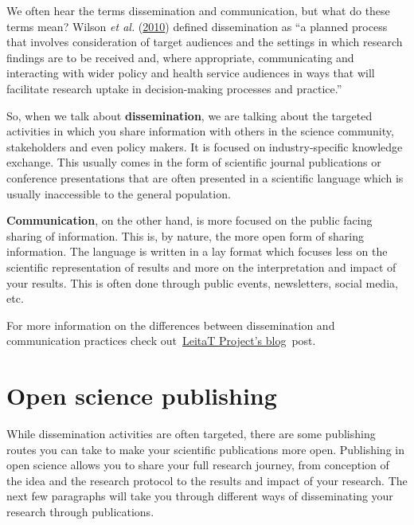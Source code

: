 \documentclass[
]{book}
\begin{document}
We often hear the terms dissemination and communication, but what do these terms mean? Wilson \emph{et al.} (\href{https://www.ncbi.nlm.nih.gov/pmc/articles/PMC2994786/}{2010}) defined dissemination as ``a planned process that involves consideration of target audiences and the settings in which research findings are to be received and, where appropriate, communicating and interacting with wider policy and health service audiences in ways that will facilitate research uptake in decision-making processes and practice.''

So, when we talk about \textbf{dissemination}, we are talking about the targeted activities in which you share information with others in the science community, stakeholders and even policy makers. It is focused on industry-specific knowledge exchange. This usually comes in the form of scientific journal publications or conference presentations that are often presented in a scientific language which is usually inaccessible to the general population.

\textbf{Communication}, on the other hand, is more focused on the public facing sharing of information. This is, by nature, the more open form of sharing information. The language is written in a lay format which focuses less on the scientific representation of results and more on the interpretation and impact of your results. This is often done through public events, newsletters, social media, etc.

For more information on the differences between dissemination and communication practices check out~\href{https://projects.leitat.org/communication-vs-dissemination-whats-the-difference/}{}\href{https://projects.leitat.org/communication-vs-dissemination-whats-the-difference/}{LeitaT Project's blog}~post.

\hypertarget{open-science-publishing}{%
\section{\texorpdfstring{\textbf{Open science publishing}}{Open science publishing}}\label{open-science-publishing}}

While dissemination activities are often targeted, there are some publishing routes you can take to make your scientific publications more open. Publishing in open science allows you to share your full research journey, from conception of the idea and the research protocol to the results and impact of your research. The next few paragraphs will take you through different ways of disseminating your research through publications.
\end{document}
